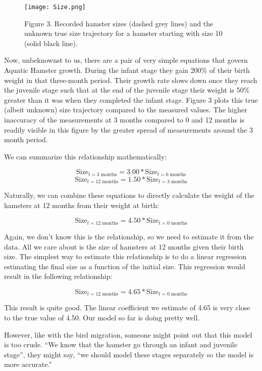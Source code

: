 \documentclass[]{memoir}
\let\Oldincludegraphics\includegraphics
\renewcommand{\includegraphics}[1]{\Oldincludegraphics[max size={\textwidth}{\textheight}]{#1}}
\begin{document}
\begin{figure}[htbp]
\centering
\texttt{[image: Size.png]}
\caption{Figure 3. Recorded hamster sizes (dashed grey lines) and the
unknown true size trajectory for a hamster starting with size 10 (solid
black line).}
\end{figure}

Now, unbeknownst to us, there are a pair of very simple equations that
govern Aquatic Hamster growth. During the infant stage they gain 200\%
of their birth weight in that three-month period. Their growth rate
slows down once they reach the juvenile stage such that at the end of
the juvenile stage their weight is 50\% greater than it was when they
completed the infant stage. Figure 3 plots this true (albeit unknown)
size trajectory compared to the measured values. The higher inaccuracy
of the measurements at 3 months compared to 0 and 12 months is readily
visible in this figure by the greater spread of measurements around the
3 month period.

We can summarize this relationship mathematically:

\[ \text{Size}_{t=\text{3 months}} = 3.00 * \text{Size}_{t=\text{0 months}} \]
\[ \text{Size}_{t=\text{12 months}} = 1.50 * \text{Size}_{t=\text{3 months}} \]

Naturally, we can combine these equations to directly calculate the
weight of the hamsters at 12 months from their weight at birth:

\[ \text{Size}_{t=\text{12 months}} = 4.50 * \text{Size}_{t=\text{0 months}} \]

Again, we don't know this is the relationship, so we need to estimate it
from the data. All we care about is the size of hamsters at 12 months
given their birth size. The simplest way to estimate this relationship
is to do a linear regression estimating the final size as a function of
the initial size. This regression would result in the following
relationship:

\[ \text{Size}_{t=\text{12 months}} = 4.65 * \text{Size}_{t=\text{0 months}} \]

This result is quite good. The linear coefficient we estimate of 4.65 is
very close to the true value of 4.50. Our model so far is doing pretty
well.

However, like with the bird migration, someone might point out that this
model is too crude. ``We know that the hamster go through an infant and
juvenile stage'', they might say, ``we should model these stages
separately so the model is more accurate.''
\end{document}
